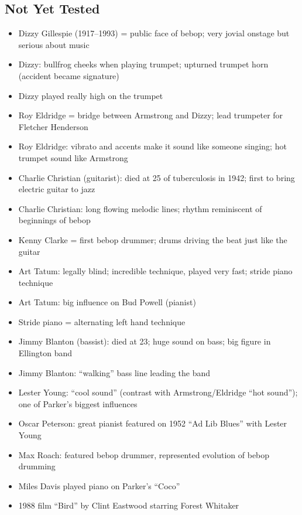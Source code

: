 \documentclass[11pt, letterpaper]{article}
\begin{document}
\subsection*{\textcolor{grayzone}{Not Yet Tested}}
\begin{itemize}[label=$\square$]
    \item Dizzy Gillespie (1917--1993) = public face of bebop; very jovial onstage but serious about music
    \item Dizzy: bullfrog cheeks when playing trumpet; upturned trumpet horn (accident became signature)
    \item Dizzy played really high on the trumpet
    \item Roy Eldridge = bridge between Armstrong and Dizzy; lead trumpeter for Fletcher Henderson
    \item Roy Eldridge: vibrato and accents make it sound like someone singing; hot trumpet sound like Armstrong
    \item Charlie Christian (guitarist): died at 25 of tuberculosis in 1942; first to bring electric guitar to jazz
    \item Charlie Christian: long flowing melodic lines; rhythm reminiscent of beginnings of bebop
    \item Kenny Clarke = first bebop drummer; drums driving the beat just like the guitar
    \item Art Tatum: legally blind; incredible technique, played very fast; stride piano technique
    \item Art Tatum: big influence on Bud Powell (pianist)
    \item Stride piano = alternating left hand technique
    \item Jimmy Blanton (bassist): died at 23; huge sound on bass; big figure in Ellington band
    \item Jimmy Blanton: ``walking'' bass line leading the band
    \item Lester Young: ``cool sound'' (contrast with Armstrong/Eldridge ``hot sound''); one of Parker's biggest influences
    \item Oscar Peterson: great pianist featured on 1952 ``Ad Lib Blues'' with Lester Young
    \item Max Roach: featured bebop drummer, represented evolution of bebop drumming
    \item Miles Davis played piano on Parker's ``Coco''
    \item 1988 film ``Bird'' by Clint Eastwood starring Forest Whitaker
\end{itemize}
\end{document}
